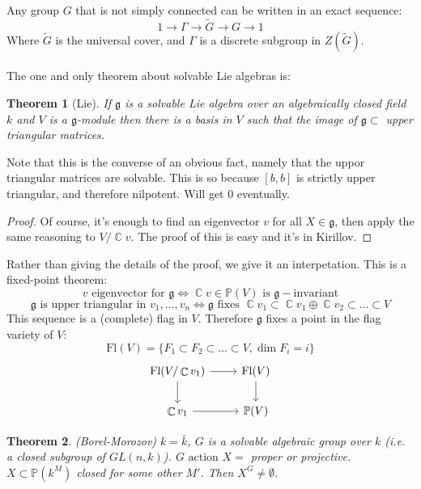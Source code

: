 \documentclass[12 pt]{article}
\DeclareMathOperator {\C} {\mathbb{C}}
\theoremstyle{plain}
\newtheorem*{thm*}{Theorem}
\theoremstyle{definition}
\theoremstyle{remark}
\begin{document}
Any group $G$ that is not simply connected can be written in an exact sequence:
\[      1 \to \Gamma \to \tilde G \to G \to 1       \]
Where $\tilde G$ is the universal cover, and $\Gamma$ is a discrete subgroup in $Z(\tilde G)$.
\\
\\
The one and only theorem about solvable Lie algebras is:
\begin{thm*} [Lie] If $\mathfrak{g}$ is a solvable Lie algebra over an algebraically closed field $k$ and $V$ is a $\mathfrak{g}$-module then there is a basis in $V$ such that the image of $\mathfrak{g} \subset$ upper triangular matrices.
\end{thm*}
Note that this is the converse of an obvious fact, namely that the uppor triangular matrices are solvable. This is so because $[b,b]$ is strictly upper triangular, and therefore nilpotent. Will get 0 eventually.
\begin{proof}
Of course, it's enough to find an eigenvector $v$ for all $X\in \mathfrak{g}$, then apply the same reasoning to $V/\C v$. The proof of this is easy and it's in Kirillov.
\end{proof}
Rather than giving the details of the proof, we give it an interpetation. This is a fixed-point theorem:
\[        v \text{ eigenvector for } \mathfrak{g} \Leftrightarrow \C v \in \mathbb{P}(V) \text{ is } \mathfrak{g}-\text{invariant}        \]
\[          \mathfrak{g} \text{ is upper triangular in } v_1, \dots , v_n \Leftrightarrow \mathfrak{g} \text{ fixes } \C v_1 \subset \C v_1 \oplus \C v_2 \subset \dots \subset V         \]
This sequence is a (complete) flag in $V$. Therefore $\mathfrak{g}$ fixes a point in the flag variety of $V$:
\[         \text{Fl}(V) = \{ F_1 \subset F_2 \subset \dots \subset V , \dim F_i = i  \}      \]
\[
\begin{tikzcd}
\text{Fl}(V/\C v_1) \arrow{r}\arrow{d} & \text{Fl}(V)\arrow{d}   \\
\C v_1 \arrow{r} & \mathbb{P}(V)
\end{tikzcd}
\]
\begin{thm*} (Borel-Morozov)
$k = \bar k$, $G$ is a solvable algebraic group over $k$ (i.e. a closed subgroup of $GL(n,k)$). $G \text{ action } X =$ proper or projective. $X \subset \mathbb{P}(k^M)$ closed for some other $M'$. Then $X^G \neq \emptyset$.
\end{thm*}
\end{document}
